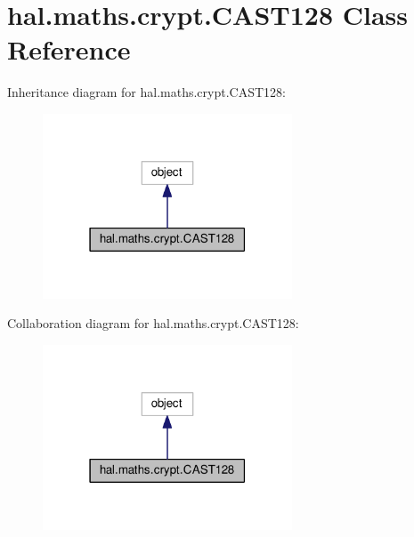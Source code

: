 \hypertarget{classhal_1_1maths_1_1crypt_1_1_c_a_s_t128}{}\section{hal.\+maths.\+crypt.\+C\+A\+S\+T128 Class Reference}
\label{classhal_1_1maths_1_1crypt_1_1_c_a_s_t128}


Inheritance diagram for hal.\+maths.\+crypt.\+C\+A\+S\+T128\+:\nopagebreak
\begin{figure}[H]
\begin{center}
\leavevmode
\includegraphics[width=210pt]{classhal_1_1maths_1_1crypt_1_1_c_a_s_t128__inherit__graph}
\end{center}
\end{figure}


Collaboration diagram for hal.\+maths.\+crypt.\+C\+A\+S\+T128\+:\nopagebreak
\begin{figure}[H]
\begin{center}
\leavevmode
\includegraphics[width=210pt]{classhal_1_1maths_1_1crypt_1_1_c_a_s_t128__coll__graph}
\end{center}
\end{figure}
